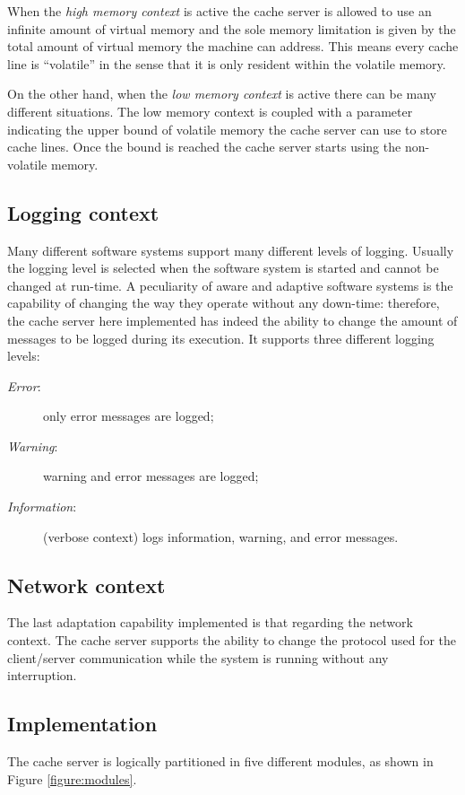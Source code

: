 \documentclass[11pt,a4paper]{article}
\begin{document}
When the \textit{high memory context} is active the cache server is allowed to use an infinite amount of virtual memory and the sole memory limitation is given by the total amount of virtual memory the machine can address. This means every cache line is ``volatile'' in the sense that it is only resident within the volatile memory.

On the other hand, when the \textit{low memory context} is active there can be many different situations. The low memory context is coupled with a parameter indicating the upper bound of volatile memory the cache server can use to store cache lines. Once the bound is reached the cache server starts using the non-volatile memory.

\subsection{Logging context}
\label{section:work:logging-context}
Many different software systems support many different levels of logging. Usually the logging level is selected when the software system is started and cannot be changed at run-time. A peculiarity of aware and adaptive software systems is the capability of changing the way they operate without any down-time: therefore, the cache server here implemented has indeed the ability to change the amount of messages to be logged during its execution. It supports three different logging levels:
\begin{description}
\item [\textit{Error}:] only error messages are logged;
\item [\textit{Warning}:] warning and error messages are logged;
\item [\textit{Information}:] (verbose context) logs information, warning, and error messages.
\end{description}

\subsection{Network context}
\label{section:work:network-context}
The last adaptation capability implemented is that regarding the network context. The cache server supports the ability to change the protocol used for the client/server communication while the system is running without any interruption.

\subsection{Implementation}
\label{section:work:implementation}
The cache server is logically partitioned in five different modules, as shown in Figure \ref{figure:modules}.
\end{document}
